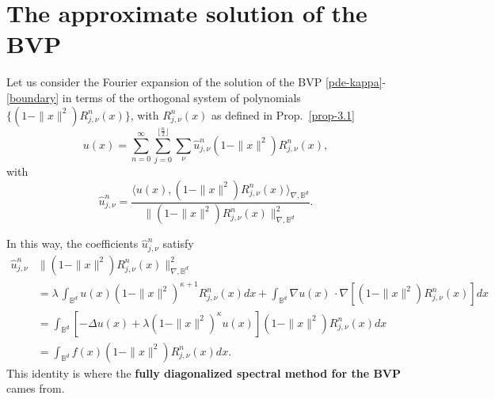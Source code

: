 \documentclass{amsart}
\theoremstyle{plain}%
\theoremstyle{definition}
\theoremstyle{remark}
\begin{document}
\section{The approximate solution of the BVP}
\setcounter{equation}{0}

Let us consider the Fourier expansion of the solution of the BVP \eqref{pde-kappa}-\eqref{boundary} in terms of the orthogonal system of polynomials $\{(1-\|x\|^2)  R_{j,\nu}^{n}(x)\}$, with \(R_{j,\nu}^{n}(x)\) as defined in Prop.~\ref{prop-3.1}
\begin{equation}\label{Fourier-coef}
u(x) = \sum_{n=0}^{\infty} \sum_{j=0}^{\lfloor \frac{n}{2} \rfloor} \sum_{\nu}
     \widehat{u}_{j,\nu}^{n} (1-\|x\|^2) R_{j,\nu}^{n}(x), 
\end{equation}
with
\[
     \widehat{u}_{j,\nu}^{n} = \frac{\langle u(x),(1-\|x\|^2) R_{j,\nu}^{n}(x)\rangle_{\nabla,\mathbb{B}^d}}{\|(1-\|x\|^2) R_{j,\nu}^n(x)\|_{\nabla,\mathbb{B}^d}^2}.
\]


In this way, the coefficients $\widehat{u}_{j,\nu}^{n}$ satisfy
\begin{align*}
\widehat{u}_{j,\nu}^{n}& \|(1-\|x\|^2) R_{j,\nu}^n(x)\|_{\nabla,\mathbb{B}^d}^2\\
& = \lambda\, \int_{\mathbb{B}^d} u(x) (1-\|x\|^2)^{\kappa+1} R_{j,\nu}^n(x)  dx +\int_{\mathbb{B}^d} \nabla u(x)\,\cdot \nabla \left[(1-\|x\|^2) R_{j,\nu}^n(x)\right] dx\\
& = \int_{\mathbb{B}^d}\left[-\Delta u(x) + \lambda (1-\|x\|^2)^{\kappa} u(x) \right] (1-\|x\|^2) R_{j,\nu}^n(x) dx\\
& = \int_{\mathbb{B}^d}f(x) (1-\|x\|^2) R_{j,\nu}^n(x) dx.
\end{align*}
This identity is where the \textbf{fully diagonalized spectral method for the BVP} cames from.

\bigskip
\end{document}
